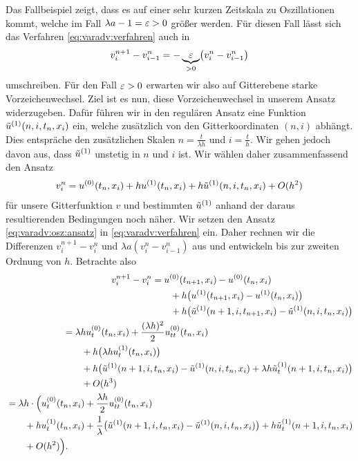Das Fallbeispiel zeigt, dass es auf einer sehr kurzen Zeitskala zu Oszillationen kommt, welche im Fall $\lambda a - 1 = \varepsilon > 0$ größer werden.
Für diesen Fall lässt sich das Verfahren \eqref{eq:varadv:verfahren} auch in
\begin{align}
v^{n+1}_i - v^n_{i-1} = - \underbrace{\varepsilon}_{> 0} \bigl( v^n_i - v^n_{i-1} \bigr)
\end{align}
umschreiben.
Für den Fall $\varepsilon > 0$ erwarten wir also auf Gitterebene starke Vorzeichenwechsel.
Ziel ist es nun, diese Vorzeichenwechsel in unserem Ansatz widerzugeben.
Dafür führen wir in den regulären Ansatz eine Funktion $\tilde u^{(1)}(n, i, t_n, x_i)$ ein, welche zusätzlich von den Gitterkoordinaten $(n,i)$ abhängt.
Dies entspräche den zusätzlichen Skalen $n = \frac t {\lambda h}$ und $i = \frac t h$.
Wir gehen jedoch davon aus, dass $\tilde u^{(1)}$ unstetig in $n$ und $i$ ist.
Wir wählen daher zusammenfassend den Ansatz
\begin{align}\label{eq:varadv:osz:ansatz}
v^n_i = u^{(0)}(t_n, x_i) + h u^{(1)}(t_n, x_i) + h \tilde u^{(1)}(n, i, t_n, x_i) + O(h^2)
\end{align}
für unsere Gitterfunktion $v$ und bestimmten $\tilde u^{(1)}$ anhand der daraus resultierenden Bedingungen noch näher.
Wir setzen den Ansatz \eqref{eq:varadv:osz:ansatz} in \eqref{eq:varadv:verfahren} ein.
Daher rechnen wir die Differenzen $v^{n+1}_i - v^n_i$ und $\lambda a (v^n_i - v^n_{i-1})$ aus und entwickeln bis zur zweiten Ordnung von $h$.
Betrachte also
{\small
\begin{align}
\begin{split} \nonumber
v^{n+1}_i - v^n_i &= u^{(0)}(t_{n+1}, x_i) - u^{(0)}(t_n, x_i)\\
&\qquad + h \bigl( u^{(1)}(t_{n+1}, x_i) - u^{(1)}(t_n, x_i) \bigr)\\
&\qquad + h \bigl( \tilde u^{(1)}(n+1, i, t_{n+1}, x_i) - \tilde u^{(1)}(n, i, t_n, x_i) \bigr)
\end{split}\\
\begin{split} \nonumber
&= \lambda h u^{(0)}_t(t_n, x_i) + \frac {(\lambda h)^2} 2 u^{(0)}_{tt}(t_n, x_i)\\
&\qquad + h \bigl( \lambda h u^{(1)}_t(t_n, x_i) \bigr)\\
&\qquad + h \bigl( \tilde u^{(1)}(n+1, i, t_n, x_i) - \tilde u^{(1)}(n, i, t_n, x_i) + \lambda h \tilde u^{(1)}_t(n+1, i, t_n, x_i) \bigr)\\
&\qquad + O(h^3)
\end{split}\\
\begin{split} \label{eq:osz:diff1}
&= \lambda h \cdot \Bigl( u^{(0)}_t(t_n, x_i) + \frac {\lambda h} 2 u^{(0)}_{tt}(t_n, x_i)\\
&\qquad + h u^{(1)}_t(t_n, x_i) + \frac{1}{\lambda} \bigl( \tilde u^{(1)}(n+1, i, t_n, x_i) - \tilde u^{(1)}(n, i, t_n, x_i)  \bigr) + h \tilde u^{(1)}_t(n+1, i, t_n, x_i)\\
&\qquad + O(h^2) \Bigr).
\end{split}
\end{align}
}

